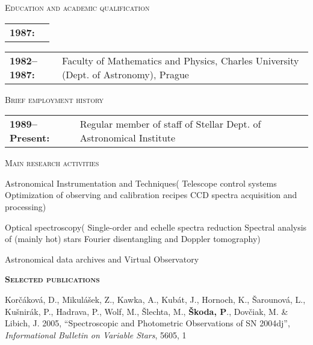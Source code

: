 \begin{cv}
\begin{cvlist}{\large \textsc{Education and academic qualification}}
\begin{tabular}{p{2.8cm}p{11cm}} {\bf{1987:}}
 \end{tabular}

  \item \begin{tabular}{p{2.8cm}p{11cm}} {\bf{1982--1987:}} & Faculty
    of Mathematics and Physics, Charles University (Dept.  of
    Astronomy), Prague

  \end{tabular}
\end{cvlist}






\noindent\hrulefill
\begin{cvlist}{\large \textsc{Brief employment history}}


\item \begin{tabular}{p{2.8cm}p{11cm}} {\bf{1989--Present:}} &
Regular member of staff of Stellar Dept. of Astronomical
Institute
\end{tabular}

\end{cvlist}




\noindent\hrulefill
\begin{cvlist}{\large \textsc{Main research activities}}

\item Astronomical Instrumentation and Techniques(
Telescope control systems
Optimization of observing and calibration recipes
CCD spectra acquisition and processing)

\item Optical spectroscopy(
Single-order and echelle spectra reduction 
Spectral analysis of (mainly hot) stars
Fourier disentangling and Doppler tomography)

\item Astronomical data archives  and Virtual Observatory



\item{\bf{\textsc{Selected publications}}}
\item Kor{\v c}\'akov\'a, D., {Mikul\'a\v{s}ek}, Z., {Kawka}, A., {Kub\'at},
J., {Hornoch}, K., {\v{S}arounov\'a}, L., {Ku\v{s}nir\'ak}, P., {Hadrava}, P.,
{Wolf}, M., {\v{S}lechta}, M., {\bf {\v{S}koda}, P}., {Dov\v{c}iak}, M. \&
{Libich}, J. 2005, ``Spectroscopic and Photometric Observations of SN 2004dj'',
{\em Informational Bulletin on Variable Stars\/}, {5605}, 1


\end{cvlist}
\end{cv}
